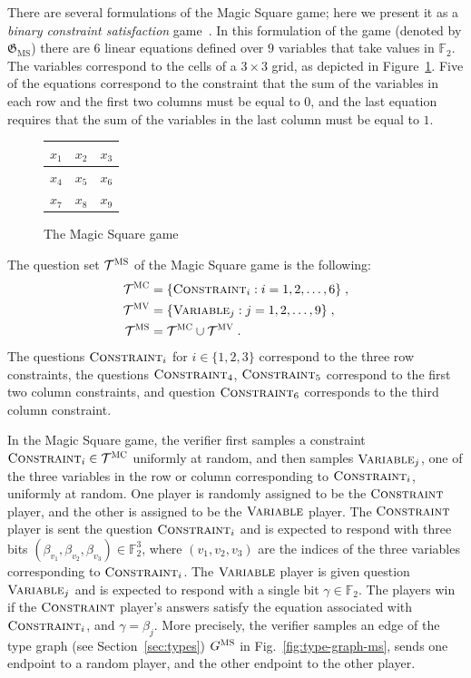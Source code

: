 \documentclass[11pt]{article}
\theoremstyle{definition}
\newcommand{\F}{\ensuremath{\mathbb{F}}}
\newcommand{\game}{\mathfrak{G}}
\newcommand{\type}{\mathcal{T}}
\newcommand{\gamestyle}[1]{\ensuremath{\textsc{#1}}\xspace}
\newcommand{\ms}{\gamestyle{MS}}
\newcommand{\labelstyle}[1]{\ensuremath{\textsc{#1}}\xspace}
\newcommand{\msc}{\labelstyle{MC}}
\newcommand{\msv}{\labelstyle{MV}}
\newcommand{\typestyle}[1]{\ensuremath{\textsc{#1}}\xspace}
\newcommand{\Constraint}{\typestyle{Constraint}}
\newcommand{\Variable}{\typestyle{Variable}}
\newcommand{\MS}{\mathrm{MS}}
\begin{document}
There are several formulations of the Magic Square game; here we present it as a
\emph{binary constraint satisfaction} game~\cite{cleve2014characterization}.
In this formulation of the game (denoted by $\game_\MS$) there are $6$ linear
equations defined over $9$ variables that take values in $\F_2$.
The variables correspond to the cells of a $3 \times 3$ grid, as depicted in
Figure~\ref{fig:ms}.
Five of the equations correspond to the constraint that the sum of the variables
in each row and the first two columns must be equal to $0$, and the last
equation requires that the sum of the variables in the last column must be equal
to $1$.

\begin{figure}[ht!]
	\begin{center}
    \renewcommand{\arraystretch}{1.6}
		\begin{tabular}{|c|c|c|}
			\hline
			$x_1$ & $x_2$ & $x_3$ \\
			\hline 
			$x_4$ & $x_5$ & $x_6$ \\	
			\hline
			$x_7$ & $x_8$ & $x_9$ \\
			\hline
		\end{tabular}
		\caption{The Magic Square game}
		\label{fig:ms}
		\end{center}
\end{figure}

The question set $\type^\ms$ of the Magic Square game is the following:
\begin{equation*}
  \begin{split}
    \type^\msc & = \{ \Constraint_i : i = 1, 2, \ldots, 6\}\;,\\
    \type^\msv & = \{ \Variable_j : j = 1, 2, \ldots, 9\}\;,\\
    \type^\ms & = \type^\msc \cup \type^\msv\;.
  \end{split}
\end{equation*}
The questions $\Constraint_i$ for $i \in \{1,2,3\}$ correspond to the three row
constraints, the questions $\Constraint_4$, $\Constraint_5$ correspond to the first
two column constraints, and question $\Constraint_6$ corresponds to the third
column constraint.

In the Magic Square game, the verifier first samples a constraint $\Constraint_i
\in \type^\msc$ uniformly at random, and then samples $\Variable_j$, one of the
three variables in the row or column corresponding to $\Constraint_i$, uniformly
at random.
One player is randomly assigned to be the $\Constraint$ player, and the other is
assigned to be the $\Variable$ player.
The $\Constraint$ player is sent the question $\Constraint_i$ and is expected to
respond with three bits $(\beta_{v_1}, \beta_{v_2}, \beta_{v_3}) \in \F_2^3$,
where $(v_1,v_2,v_3)$ are the indices of the three variables corresponding to
$\Constraint_i$.
The $\Variable$ player is given question $\Variable_j$ and is expected to
respond with a single bit $\gamma \in \F_2$.
The players win if the $\Constraint$ player's answers satisfy the equation
associated with $\Constraint_i$, and $\gamma = \beta_j$.
More precisely, the verifier samples an edge of the type graph (see Section~\ref{sec:types}) $G^\ms$
in Fig.~\ref{fig:type-graph-ms}, sends one endpoint to a random player, and the
other endpoint to the other player.
\end{document}
